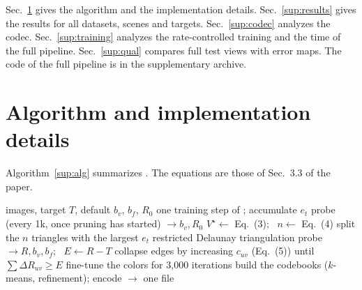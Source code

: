 \appendix
\setcounter{table}{0}
\setcounter{figure}{0}
\setcounter{equation}{0}
\setcounter{algorithm}{0}
\providecommand{\MipNeRF}{\emph{Mip-NeRF~360}\xspace}
\providecommand{\TandT}{\emph{Tanks and Temples}\xspace}
\providecommand{\DeepBlending}{\emph{Deep Blending}\xspace}
\providecommand{\NeRFSyn}{\emph{NeRF-Synthetic}\xspace}

Sec.~\ref{sup:impl} gives the algorithm and the implementation details. Sec.~\ref{sup:results} gives the results for all datasets, scenes and targets. Sec.~\ref{sup:codec} analyzes the codec. Sec.~\ref{sup:training} analyzes the rate-controlled training and the time of the full pipeline. Sec.~\ref{sup:qual} compares full test views with error maps. The code of the full pipeline is in the supplementary archive.

\section{Algorithm and implementation details}
\label{sup:impl}

Algorithm~\ref{sup:alg} summarizes \BM. The equations are those of Sec.~3.3 of the paper.

\begin{algorithm}[h]
\caption{\BM for a target file size $T$}
\label{sup:alg}
\small
\begin{algorithmic}[1]
\Require images, target $T$, default $b_v$, $b_f$, $R_0$
  \State one training step of \MS; accumulate $e_t$
    \State probe (every 1k, once pruning has started) $\rightarrow b_v, R_0$
    \State $V^\star \gets$ Eq.~(3); \ $n \gets$ Eq.~(4)
    \State split the $n$ triangles with the largest $e_t$
  \EndIf
   restricted Delaunay triangulation \EndIf
    \State probe $\rightarrow R, b_v, b_f$; \ $E \gets R - T$
      \State collapse edges by increasing $c_{uv}$ (Eq.~(5)) until $\sum \Delta R_{uv} \ge E$
    \EndIf
  \EndIf
\EndFor
\State fine-tune the colors for 3{,}000 iterations
\State build the codebooks ($k$-means, refinement); encode $\rightarrow$ one file
\end{algorithmic}
\end{algorithm}

